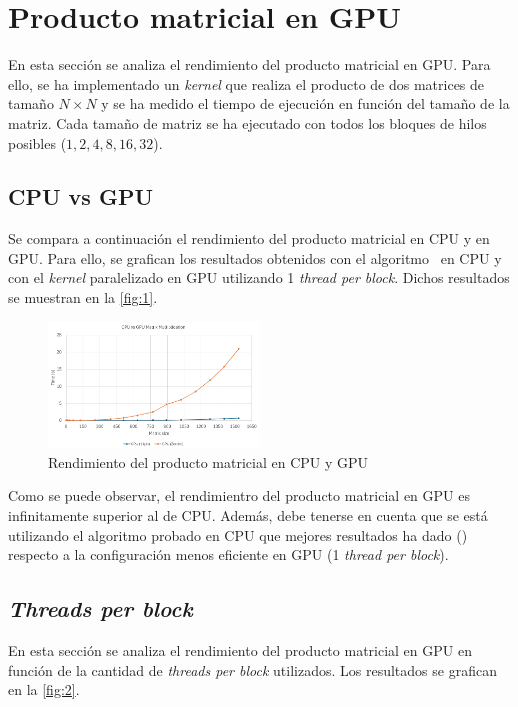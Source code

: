 \pagestyle{fancy}
\fancyhead[LO]{\autorR}
\fancyhead[LE]{\autorA}
\fancyhead[RE,RO]{\textit{\rightmark}}
\fancyfoot[L]{\asignaturaAbbr}
\fancyfoot[R]{\fecha}

\section{Producto matricial en GPU} \label{sec:3}
En esta sección se analiza el rendimiento del producto matricial en GPU. Para ello, se ha implementado un \textit{kernel} 
que realiza el producto de dos matrices de tamaño $N \times N$ y se ha medido el tiempo de ejecución en función del tamaño de 
la matriz. Cada tamaño de matriz se ha ejecutado con todos los bloques de hilos posibles ($1, 2, 4, 8, 16, 32$).

\subsection{CPU vs GPU}
Se compara a continuación el rendimiento del producto matricial en CPU y en GPU. Para ello, se grafican los resultados obtenidos 
con el algoritmo \zorder\ en CPU y con el \textit{kernel} paralelizado en GPU utilizando 1 \textit{thread per block}. Dichos 
resultados se muestran en la \autoref{fig:1}.

\begin{figure}[h]
    \centering
    \includegraphics[width=0.5\textwidth]{img/1.png}
    \caption{Rendimiento del producto matricial en CPU y GPU}
    \label{fig:1}
\end{figure}

Como se puede observar, el rendimientro del producto matricial en GPU es infinitamente superior al de CPU. Además, debe tenerse en 
cuenta que se está utilizando el algoritmo probado en CPU que mejores resultados ha dado (\zorder) respecto a la configuración 
menos eficiente en GPU (1 \textit{thread per block}). 

\subsection{\textit{Threads per block}}
En esta sección se analiza el rendimiento del producto matricial en GPU en función de la cantidad de \textit{threads per block}
utilizados. Los resultados se grafican en la \autoref{fig:2}.

